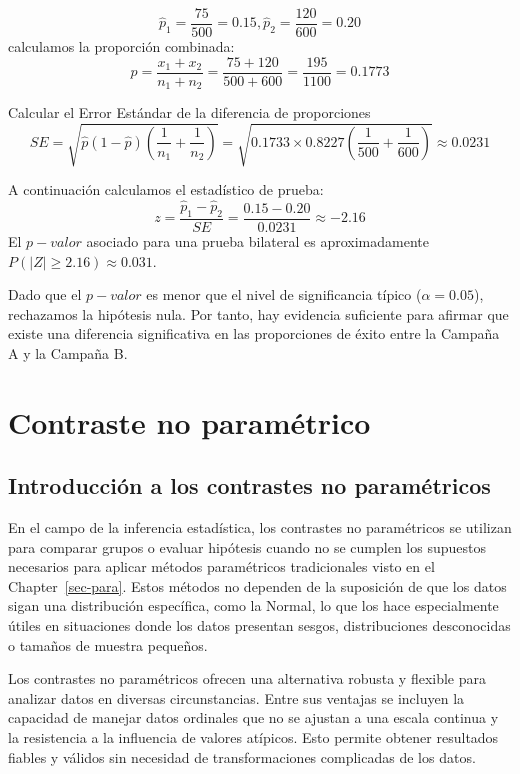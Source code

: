 \documentclass[
  letterpaper,
  DIV=11,
  numbers=noendperiod]{scrreprt}
\begin{document}
\begin{tcolorbox}
\[\hat{p}_1 = \frac{75}{500} = 0.15, \hat{p}_2 = \frac{120}{600} = 0.20\]
calculamos la proporción combinada:
\[  \hat{p} = \frac{x_1 + x_2}{n_1 + n_2} = \frac{75 + 120}{500 + 600} = \frac{195}{1100} = 0.1773
\]

Calcular el Error Estándar de la diferencia de proporciones
\[  SE = \sqrt{\hat{p} (1 - \hat{p}) \left( \frac{1}{n_1} + \frac{1}{n_2} \right)} = \sqrt{0.1733 \times 0.8227 \left( \frac{1}{500} + \frac{1}{600} \right)} \approx 0.0231
\]

A continuación calculamos el estadístico de prueba:
\[z = \frac{\hat{p}_1 - \hat{p}_2}{SE} = \frac{0.15 - 0.20}{0.0231} \approx -2.16\]
El \(p-valor\) asociado para una prueba bilateral es aproximadamente
\(P(|Z|\geq 2.16)\approx 0.031\).

Dado que el \(p-valor\) es menor que el nivel de significancia típico
(\(\alpha = 0.05\)), rechazamos la hipótesis nula. Por tanto, hay
evidencia suficiente para afirmar que existe una diferencia
significativa en las proporciones de éxito entre la Campaña A y la
Campaña B.

\end{tcolorbox}


\hypertarget{sec-nopara}{%
\chapter{Contraste no paramétrico}\label{sec-nopara}}

\hypertarget{introducciuxf3n-a-los-contrastes-no-paramuxe9tricos}{%
\section{Introducción a los contrastes no
paramétricos}\label{introducciuxf3n-a-los-contrastes-no-paramuxe9tricos}}

En el campo de la inferencia estadística, los contrastes no paramétricos
se utilizan para comparar grupos o evaluar hipótesis cuando no se
cumplen los supuestos necesarios para aplicar métodos paramétricos
tradicionales visto en el Chapter~\ref{sec-para}. Estos métodos no
dependen de la suposición de que los datos sigan una distribución
específica, como la Normal, lo que los hace especialmente útiles en
situaciones donde los datos presentan sesgos, distribuciones
desconocidas o tamaños de muestra pequeños.

Los contrastes no paramétricos ofrecen una alternativa robusta y
flexible para analizar datos en diversas circunstancias. Entre sus
ventajas se incluyen la capacidad de manejar datos ordinales que no se
ajustan a una escala continua y la resistencia a la influencia de
valores atípicos. Esto permite obtener resultados fiables y válidos sin
necesidad de transformaciones complicadas de los datos.
\end{document}
